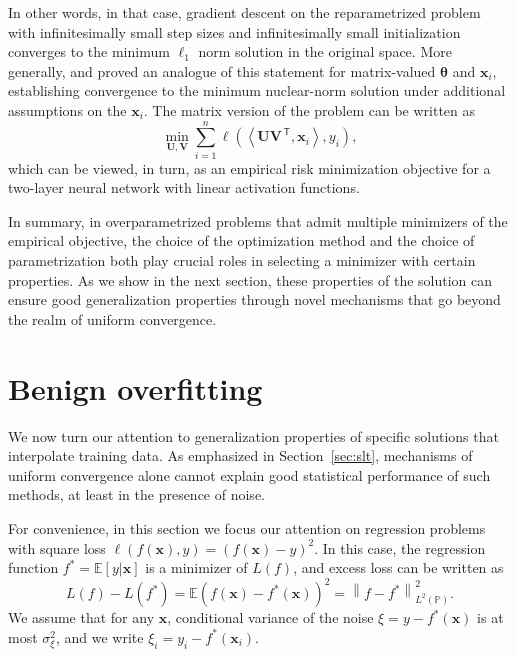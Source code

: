 In other words, in that case, gradient descent on the reparametrized problem with infinitesimally small step sizes and infinitesimally small initialization converges to the minimum $\ell_1$ norm solution in the original space. More generally, \cite{gunasekar2017implicit} and \cite{li2018algorithmic} proved an analogue of this statement for matrix-valued ${\boldsymbol \theta}$ and ${\boldsymbol x}_i$, establishing convergence to the minimum nuclear-norm solution under additional assumptions on the ${\boldsymbol x}_i$. The matrix version of the problem can be written as
$$\min_{{\boldsymbol U},{\boldsymbol V}} \sum_{i=1}^n \ell (\left\langle {\boldsymbol U}{\boldsymbol V}^\ensuremath{{\scriptscriptstyle\mathsf{\,T}}}, {\boldsymbol x}_i \right\rangle, y_i),$$ which can be viewed, in turn, as an empirical risk minimization objective for a two-layer neural network with linear activation functions. 

In summary, in overparametrized problems that admit multiple minimizers of the empirical objective, the choice of the optimization method and the choice of parametrization both play crucial roles in selecting a minimizer with certain properties. As we show in the next section, these properties of the solution can ensure good generalization properties through novel mechanisms that go beyond the realm of uniform convergence.

\section{Benign overfitting}
\label{sec:benign}

We now turn our attention to generalization properties of specific solutions that interpolate training data. As emphasized in
Section~\ref{sec:slt}, mechanisms of uniform convergence alone cannot explain good statistical performance of such methods, at least in the presence of noise.

For convenience, in this section we focus our attention on regression problems with square loss $\ell (f({\boldsymbol x}),y) = (f({\boldsymbol x})-y)^2$. In this case, the regression function $f^*=\mathbb{E}[y|{\boldsymbol x}]$ is a minimizer of $L(f)$, and excess loss can be written as $$L(f) - L(f^*) = \mathbb{E}(f({\boldsymbol x})-f^*({\boldsymbol x}))^2 =
\left\|f-f^*\right\|^2_{L^2(\mathbb{P})}.$$
We assume that for any ${\boldsymbol x}$, conditional variance of the noise $\xi= y-f^*({\boldsymbol x})$ is at most $\sigma_\xi^2$, and we write $\xi_i=y_i-f^*({\boldsymbol x}_i)$.

